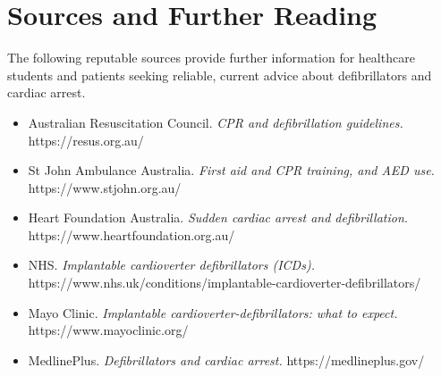 \section*{Sources and Further Reading}
The following reputable sources provide further information for healthcare students and patients seeking reliable, current advice about defibrillators and cardiac arrest.

\begin{itemize}
    \item Australian Resuscitation Council. \textit{CPR and defibrillation guidelines.} https://resus.org.au/
    \item St John Ambulance Australia. \textit{First aid and CPR training, and AED use.} https://www.stjohn.org.au/
    \item Heart Foundation Australia. \textit{Sudden cardiac arrest and defibrillation.} https://www.heartfoundation.org.au/
    \item NHS. \textit{Implantable cardioverter defibrillators (ICDs).} https://www.nhs.uk/conditions/implantable-cardioverter-defibrillators/
    \item Mayo Clinic. \textit{Implantable cardioverter-defibrillators: what to expect.} https://www.mayoclinic.org/
    \item MedlinePlus. \textit{Defibrillators and cardiac arrest.} https://medlineplus.gov/
\end{itemize}
